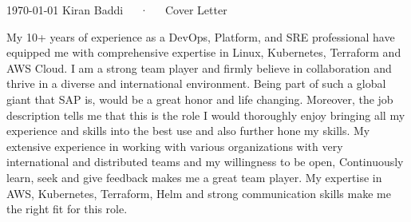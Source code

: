 \documentclass[11pt, a4paper]{awesome-cv}
\begin{document}
\makecvheader[R]

\makecvfooter
  {\today}
  {Kiran Baddi~~~·~~~Cover Letter}
  {}

\makelettertitle

\begin{cvletter}

My 10+ years of experience as a DevOps, Platform, and SRE professional have equipped me with comprehensive expertise in Linux, Kubernetes, Terraform and AWS Cloud. I am a strong team player and firmly believe in collaboration and thrive in a diverse and international environment. 
Being part of such a global giant that SAP is, would be a great honor and life changing. Moreover, the job description tells me that this is the role I would thoroughly enjoy bringing all my experience and skills into the best use and also further hone my skills.
My extensive experience in working with various organizations with very international and distributed teams and my willingness to be open, Continuously learn, seek and give feedback makes me a great team player. My expertise in AWS, Kubernetes, Terraform, Helm and strong communication skills make me the right fit for this role.
\end{cvletter}


\makeletterclosing
\end{document}
